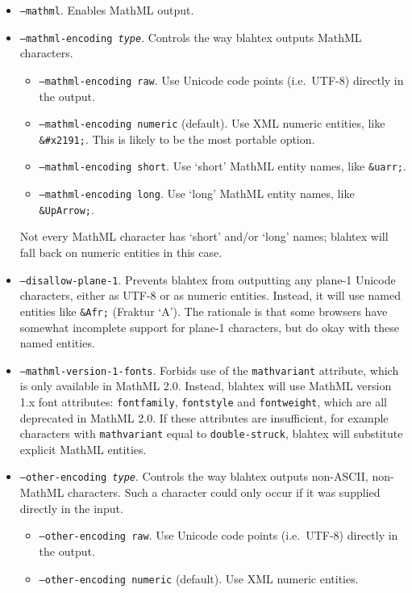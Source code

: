 \documentclass{article}
\begin{document}
\begin{itemize}
\item \texttt{--mathml}. Enables MathML output.
\item \texttt{--mathml-encoding \textit{type}}. Controls the way blahtex outputs MathML characters.
\begin{itemize}
\item \texttt{--mathml-encoding raw}. Use Unicode code points (i.e.~UTF-8) directly in the output.
\item \texttt{--mathml-encoding numeric} (default). Use XML numeric entities, like \texttt{\&\#x2191;}. This is likely to be the most portable option.
\item \texttt{--mathml-encoding short}. Use `short' MathML entity names, like \texttt{\&uarr;}.
\item \texttt{--mathml-encoding long}. Use `long' MathML entity names, like \texttt{\&UpArrow;}.
\end{itemize}
Not every MathML character has `short' and/or `long' names; blahtex will fall back on numeric entities in this case.
\item \texttt{--disallow-plane-1}. Prevents blahtex from outputting any plane-1 Unicode characters, either as UTF-8 or as numeric entities. Instead, it will use named entities like \texttt{\&Afr;} (Fraktur `A'). The rationale is that some browsers have somewhat incomplete support for plane-1 characters, but do okay with these named entities.
\item \texttt{--mathml-version-1-fonts}. Forbids use of the \texttt{mathvariant} attribute, which is only available in MathML 2.0. Instead, blahtex will use MathML version 1.x font attributes: \texttt{fontfamily}, \texttt{fontstyle} and \texttt{fontweight}, which are all deprecated in MathML 2.0. If these attributes are insufficient, for example characters with \texttt{mathvariant} equal to \texttt{double-struck}, blahtex will substitute explicit MathML entities.
\item \texttt{--other-encoding \textit{type}}. Controls the way blahtex outputs non-ASCII, non-MathML characters. Such a character could only occur if it was supplied directly in the input.
\begin{itemize}
\item \texttt{--other-encoding raw}. Use Unicode code points (i.e.~UTF-8) directly in the output.
\item \texttt{--other-encoding numeric} (default). Use XML numeric entities.
\end{itemize}

\end{itemize}
\end{document}
